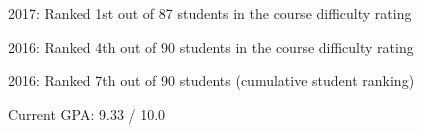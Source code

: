 

\begin{cventries}

\cventry
{} 
{}
{}
{} 
{
 \begin{cvitems}
\item {2017: Ranked 1st out of 87 students in the course difficulty rating}
\item {2016: Ranked 4th out of 90 students in the course difficulty rating}
\item {2016: Ranked 7th out of 90 students (cumulative student ranking)}
\item {Current GPA: 9.33 / 10.0}
 \end{cvitems}
}

\end{cventries}